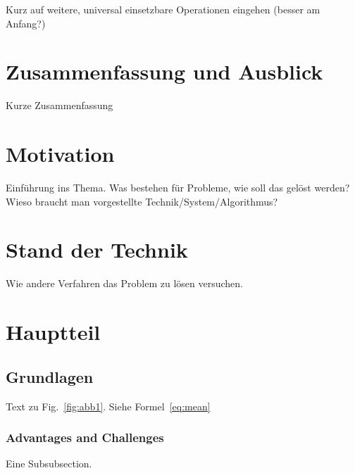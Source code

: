 \documentclass{llncs}
\begin{document}
Kurz auf weitere, universal einsetzbare Operationen eingehen (besser am Anfang?)

\section{Zusammenfassung und Ausblick}
\label{sec:Zusammenfassung}

Kurze Zusammenfassung

 






\newpage

\section{Motivation}
\label{sec:Motivation}
Einführung ins Thema. Was bestehen für Probleme, wie soll das gelöst werden? \\

Wieso braucht man vorgestellte Technik/System/Algorithmus?



\section{Stand der Technik} \label{sec:sdt}
%
Wie andere Verfahren das Problem zu lösen versuchen. \cite{OCBible}

\section{Hauptteil}
\label{sec:Hauptteil}

\subsection{Grundlagen}
\label{sec:Grundlagen}
Text zu Fig.~\ref{fig:abb1}. Siehe Formel~\ref{eq:mean}

\subsubsection{Advantages and Challenges}
Eine Subsubsection.
\end{document}
